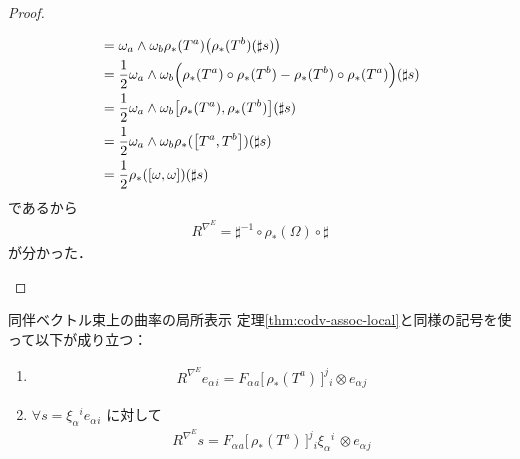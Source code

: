 \documentclass[geometry_main]{subfiles}
\begin{document}
\begin{proof}
\begin{enumerate}
\begin{align}
            &= \omega_a \wedge \omega_b \rho_*(T^a) \bigl( \rho_*(T^b)(\sharp s) \bigr)  \\
            &= \frac{1}{2} \omega_a \wedge \omega_b \Bigl(\rho_*(T^a) \circ \rho_*(T^b) - \rho_*(T^b) \circ \rho_*(T^a) \Bigr)(\sharp s) \\
            &= \frac{1}{2} \omega_a \wedge \omega_b \comm{\rho_*(T^a)}{\rho_*(T^b)}(\sharp s) \\
            &= \frac{1}{2} \omega_a \wedge \omega_b \rho_*(\comm{T^a}{T^b})(\sharp s) \\
            &= \frac{1}{2} \rho_*(\comm{\omega}{\omega})(\sharp s)
        \end{align}
        であるから
        \begin{align}
            R^{\nabla^E} = \sharp^{-1} \circ \rho_*(\Omega)  \circ \sharp
        \end{align}
        が分かった．

    \end{enumerate}
\end{proof}

\begin{mytheo}[label=thm:curvature-assoc-local]{同伴ベクトル束上の曲率の局所表示}
    定理\ref{thm:codv-assoc-local}と同様の記号を使って以下が成り立つ：
    \begin{enumerate}
        \item \begin{align}
            R^{\nabla^E} e_{\alpha}{}_i = F_\alpha{}_a \bigl[\, \rho_*(T^a) \,\bigr]^j{}_i \otimes  e_\alpha{}_j
        \end{align}
        \item $\forall s = \xi_\alpha{}^i e_{\alpha}{}_i$ に対して
        \begin{align}
            R^{\nabla^E} s = F_\alpha{}_a \bigl[\, \rho_*(T^a) \,\bigr]^j{}_i \xi_\alpha{}^i\, \otimes  e_\alpha{}_j
        \end{align}
        
    \end{enumerate}
    
\end{mytheo}
\end{document}

